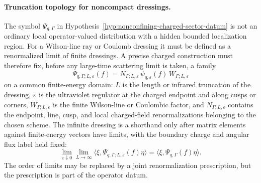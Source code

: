 \paragraph{Truncation topology for noncompact dressings.}
The symbol \(\Psi_{q,\Gamma}\) in
Hypothesis~\ref{hyp:nonconfining-charged-sector-datum} is not an ordinary
local operator-valued distribution with a hidden bounded localization region.
For a Wilson-line ray or Coulomb dressing it must be defined as a
renormalized limit of finite dressings.  A precise charged construction must
therefore fix, before any large-time scattering limit is taken, a family
\[
  \Psi_{q,\Gamma;L,\varepsilon}(f)
  =
  N_{\Gamma;L,\varepsilon}\,
  \psi_{q,\varepsilon}(f)\,W_{\Gamma;L,\varepsilon}
\]
on a common finite-energy domain: \(L\) is the length or infrared truncation
of the dressing, \(\varepsilon\) is the ultraviolet regulator at the charged
endpoint and along cusps or corners, \(W_{\Gamma;L,\varepsilon}\) is the
finite Wilson-line or Coulombic factor, and \(N_{\Gamma;L,\varepsilon}\)
contains the endpoint, line, cusp, and local charged-field renormalizations
belonging to the chosen scheme.  The infinite dressing is a shorthand only
after matrix elements against finite-energy vectors have limits, with the
boundary charge and angular flux label held fixed:
\[
  \lim_{\varepsilon\downarrow0}\lim_{L\to\infty}
  \langle\xi,\Psi_{q,\Gamma;L,\varepsilon}(f)\eta\rangle
  =
  \langle\xi,\Psi_{q,\Gamma}(f)\eta\rangle .
\]
The order of limits may be replaced by a joint renormalization prescription,
but the prescription is part of the operator datum.

